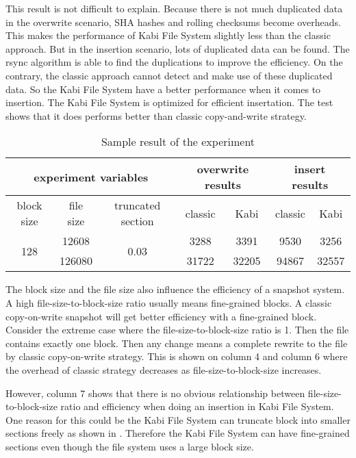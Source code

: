     This result is not difficult to explain. Because there is not much duplicated data in the overwrite scenario, SHA hashes and rolling checksums become overheads. This makes the performance of Kabi File System slightly less than the classic approach. But in the insertion scenario, lots of duplicated data can be found. The rsync algorithm is able to find the duplications to improve the efficiency. On the contrary, the classic approach cannot detect and make use of these duplicated data. So the Kabi File System have a better performance when it comes to insertion. The Kabi File System is optimized for efficient insertation. The test shows that it does performs better than classic copy-and-write strategy.

\begin{table}[t]
\caption{Sample result of the experiment}
\label{tab:sample_result}
\begin{center}
\begin{tabular}{|c|c|c|cccc|}
\hline
\multicolumn{3}{|c|}{experiment variables} & \multicolumn{2}{c|}{overwrite results} & \multicolumn{2}{c|}{insert results}\\
\hline
block size & file size & truncated section & \multicolumn{1}{c|}{classic} & \multicolumn{1}{c|}{Kabi} & \multicolumn{1}{c|}{classic} & Kabi\\
\hline
\multirow{2}{*}{128} & 12608 & \multirow{2}{*}{0.03} & 3288 & 3391 & 9530 & 3256 \\
& 126080 & & 31722 & 32205 & 94867 & 32557 \\
\hline
\end{tabular}
\end{center}
\end{table}

    The block size and the file size also influence the efficiency of a snapshot system. A high file-size-to-block-size ratio usually means fine-grained blocks. A classic copy-on-write snapshot will get better efficiency with a fine-grained block. Consider the extreme case where the file-size-to-block-size ratio is 1. Then the file contains exactly one block. Then any change means a complete rewrite to the file by classic copy-on-write strategy. This is shown on  column 4 and column 6 where the overhead of classic strategy decreases as file-size-to-block-size increases.

    However, column 7 shows that there is no obvious relationship between file-size-to-block-size ratio and efficiency when doing an insertion in Kabi File System. One reason for this could be the Kabi File System can truncate block into smaller sections freely as shown in . Therefore the Kabi File System can have fine-grained sections even though the file system uses a large block size.
    
